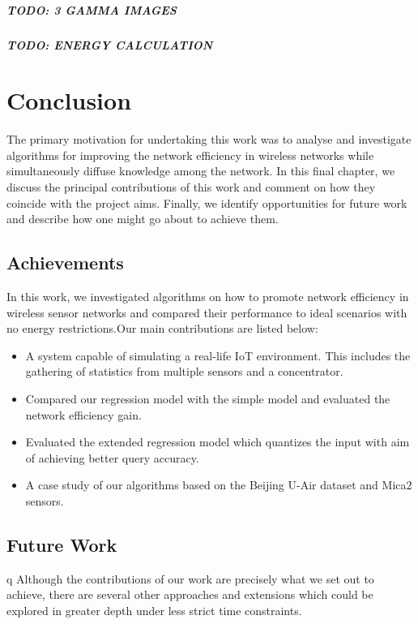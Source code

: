 \documentclass{mproj}
\begin{document}
\paragraph{TODO: 3 GAMMA IMAGES}

\paragraph{TODO: ENERGY CALCULATION}

\chapter{Conclusion}
The primary motivation for undertaking this work was to analyse and investigate algorithms for improving the network efficiency in wireless networks while simultaneously diffuse knowledge among the network. In this final chapter, we discuss the principal contributions of this work and comment on how they coincide with the project aims. Finally, we identify opportunities for future work and describe how one might go about to achieve them.

\section{Achievements}
In this work, we investigated algorithms on how to promote network efficiency in wireless sensor networks and compared their performance to ideal scenarios with no energy restrictions.Our main contributions are listed below:
\begin{itemize}
\item A system capable of simulating a real-life IoT environment. This includes the gathering of statistics from multiple sensors and a concentrator.
\item Compared our regression model with the simple model and evaluated the network efficiency gain.
\item Evaluated the extended regression model which quantizes the input with aim of achieving better query accuracy.
\item A case study of our algorithms based on the Beijing U-Air dataset\cite{air-quality-inference-meets-big-data} and Mica2\cite{adaptiveDataForwarding} sensors.
\end{itemize}

\section{Future Work}q
Although the contributions of our work are precisely what we set out to achieve, there are several other approaches and extensions which could be explored in greater depth under less strict time constraints.
\end{document}
